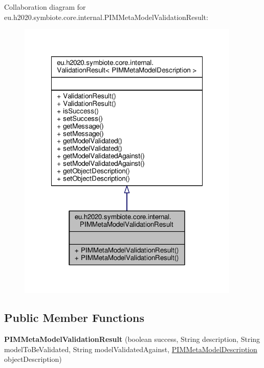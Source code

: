 Collaboration diagram for eu.\+h2020.\+symbiote.\+core.\+internal.\+P\+I\+M\+Meta\+Model\+Validation\+Result\+:\nopagebreak
\begin{figure}[H]
\begin{center}
\leavevmode
\includegraphics[width=300pt]{classeu_1_1h2020_1_1symbiote_1_1core_1_1internal_1_1PIMMetaModelValidationResult__coll__graph}
\end{center}
\end{figure}
\subsection*{Public Member Functions}
\begin{DoxyCompactItemize}
\item 
\mbox{\label{classeu_1_1h2020_1_1symbiote_1_1core_1_1internal_1_1PIMMetaModelValidationResult_af9de2aa91d73725fa048646328e7a8de}} 
{\bfseries P\+I\+M\+Meta\+Model\+Validation\+Result} (boolean success, String description, String model\+To\+Be\+Validated, String model\+Validated\+Against, \hyperlink{classeu_1_1h2020_1_1symbiote_1_1core_1_1internal_1_1PIMMetaModelDescription}{P\+I\+M\+Meta\+Model\+Description} object\+Description)
\end{DoxyCompactItemize}


